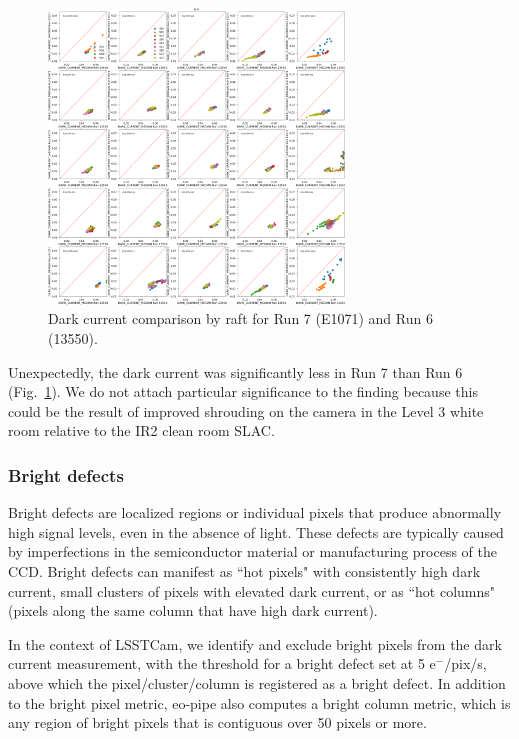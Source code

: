 \begin{figure}[ht]
\begin{centering}
\includegraphics[width=0.7\textwidth]{figures/baselineCharacterization/13550_E1071_DARK_CURRENT_MEDIAN_inset.png}
\caption{Dark current comparison by raft for Run 7 (E1071) and Run 6 (13550).}
\label{fig:dark}
\end{centering}
\end{figure}

Unexpectedly, the dark current was significantly less in Run 7 than
Run 6 (Fig.~\ref{fig:dark}). We do not attach particular significance to the finding because this could be the result of improved shrouding on the camera in the Level 3 white room relative to the IR2 clean room SLAC.

\clearpage
\subsubsection{Bright defects}\label{bright-defects}

Bright defects are localized regions or individual pixels that produce abnormally high signal levels, even in the absence of light. These defects are typically caused by imperfections in the semiconductor material or manufacturing process of the CCD. Bright defects can manifest as ``hot pixels" with consistently high dark current, small clusters of pixels with elevated dark current, or as ``hot columns" (pixels along the same column that have high dark current). 

In the context of LSSTCam, we identify and exclude bright pixels from the dark current measurement, with the threshold for a bright defect set at 5 e$^-$/pix/s, above which the pixel/cluster/column is registered as a bright defect. In addition to the bright pixel metric, eo-pipe also computes a bright column metric, which is any region of bright pixels that is contiguous over 50 pixels or more.

